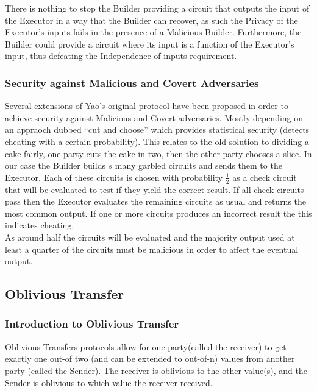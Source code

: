 \documentclass[a4paper,10pt]{article}
\begin{document}
				There is nothing to stop the Builder providing a circuit that outputs the input of the Executor in a way that the Builder can recover, as such the Privacy of the Executor's inputs fails in the presence of a Malicious Builder. Furthermore, the Builder could provide a circuit where its input is a function of the Executor's input, thus defeating the Independence of inputs requirement.


			\subsubsection{Security against Malicious and Covert Adversaries}
				Several extensions of Yao's original protocol have been proposed in order to achieve security against Malicious and Covert adversaries. Mostly depending on an appraoch dubbed ``cut and choose'' which provides statistical security (detects cheating with a certain probability). This relates to the old solution to dividing a cake fairly, one party cuts the cake in two, then the other party chooses a slice. In our case the Builder builds $s$ many garbled circuits and sends them to the Executor. Each of these circuits is chosen with probability $\frac{1}{2}$ as a check circuit that will be evaluated to test if they yield the correct result. If all check circuits pass then the Executor evaluates the remaining circuits as usual and returns the most common output. If one or more circuits produces an incorrect result the this indicates cheating.\\

				As around half the circuits will be evaluated and the majority output used at least a quarter of the circuits must be malicious in order to affect the eventual output. 


		\subsection{Oblivious Transfer} \label{OT_Intro}	
			\subsubsection{Introduction to Oblivious Transfer}
				Oblivious Transfers protocols allow for one party(called the receiver) to get exactly one out-of two (and can be extended to out-of-n) values from another party (called the Sender). The receiver is oblivious to the other value(s), and the Sender is oblivious to which value the receiver received.\\
\end{document}
